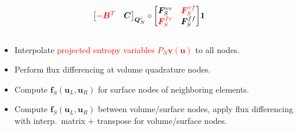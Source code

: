 \documentclass[compress]{beamer}
\theoremstyle{plain}
\renewcommand\hat{\widehat}
\newcommand{\pd}[2]{\frac{\partial #1}{\partial #2}}
\renewcommand{\note}[1]{\textcolor{red}{{#1}}}
\begin{document}
{\begin{columns}
\begin{column}{.5\textwidth}
\[{{{\begin{bmatrix}
\note{-\bm{B}^T} & \bm{C}
\end{bmatrix}}_{\bm{Q}_N^i} \circ
\begin{bmatrix}
\bm{F}^{vv}_S & \note{\bm{F}^{vf}_S}\\
\note{\bm{F}^{fv}_S} & \bm{F}^{ff}_S
\end{bmatrix} } \bm{1}
}
\]
\end{column}
\end{columns}
\begin{itemize}
\item<1-> Interpolate \note{projected entropy variables $P_N \bm{v}(\bm{u})$} to all nodes.  
\vspace{.25em}
\item<2-> Perform flux differencing at volume quadrature nodes.
\vspace{.25em}
\item<3-> Compute $\bm{f}_S(\bm{u}_L,\bm{u}_R)$ for surface nodes of neighboring elements.
\vspace{.25em}
\item<4-> Compute $\bm{f}_S(\bm{u}_L,\bm{u}_R)$ between volume/surface nodes, apply flux differencing with interp.\ matrix + transpose for volume/surface nodes.
\end{itemize} 
}


%
%

\end{document}
